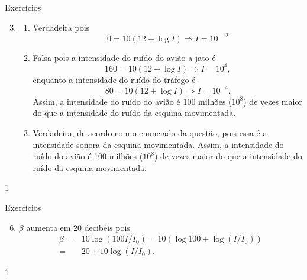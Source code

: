 \begin{answer}{Exercícios}
{
	\exerciselist
	\begin{enumerate}\setcounter{enumi}{2}
	\Item 
	\begin{align*}
	& 80 = 120+10 \log I_1 \Rightarrow  -40 = 10\log I_1\\
	\Rightarrow & I_1 = 10^{-4},
	\end{align*}
	\begin{align*}
	& 60 = 120+10 \log I_2 \Rightarrow -60 = 10\log I_2\\
	\Rightarrow & I_2 = 10^{-6},
	\end{align*}
	Assim,
	$$
	\frac{I_1}{I_2}=\frac{10^{-4}}{10^{-6}}= 100.
	$$

	\Item
	\begin{align*}
	 20 =& N_1-N_2 = 120 +10\log I_1- (120 +10\log I_1) \\
	 =& 10\log I_1 - \log I_2 = 10\log (I_1/I_2)\\
	\Rightarrow I_1/I_2  =& 10^{2}
	\end{align*}

	\item
	\begin{enumerate}
	\item Verdadeira pois
	$$
	0 = 10(12+\log I) \Rightarrow I = 10^{-12}
	$$
	\item Falsa pois a intensidade do ruído do avião a jato é
	$$
	160 = 10(12+\log I) \Rightarrow I = 10^{4},
	$$
	enquanto a intensidade do ruído do tráfego é
	$$
	80 = 10(12+\log I) \Rightarrow I = 10^{-4}.
	$$
	Assim, a intensidade do ruído do avião é 100 milhões ($10^8$) de vezes maior do que a intensidade do ruído da esquina movimentada.
	\item Verdadeira, de acordo com o enunciado da questão, pois essa é a intensidade sonora da esquina movimentada.
	Assim, a intensidade do ruído do avião é 100 milhões ($10^8$) de vezes maior do que a intensidade do ruído da esquina movimentada.
	\end{enumerate}
	\end{enumerate}
}{1}
\end{answer}
\clearmargin
\begin{answer}{Exercícios}
{
	\exerciselist
	\begin{enumerate}\setcounter{enumi}{5}
	\item $\beta$ aumenta em 20 decibéis pois
	\begin{align*}
	\beta =& 10\log(100 I/I_0) = 10(\log 100 + \log(I/I_0))\\
	=& 20 + 10\log(I/I_0).
	\end{align*}
	\end{enumerate}
}{1}
\end{answer}
\exercise

